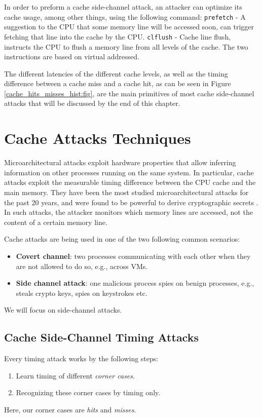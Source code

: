 In order to preform a cache side-channel attack, an attacker can optimize its cache usage, among other things, using the following command: \texttt{prefetch} - A suggestion to the CPU that some memory line will be accessed soon, can trigger fetching that line into the cache by the CPU. \texttt{clflush} - Cache line flush, instructs the CPU to flush a memory line from all levels of the cache. The two instructions are based on virtual addressed.

The different latencies of the different cache levels, as well as the timing difference between a cache miss and a cache hit, as can be seen in Figure \ref{cache_hits_misses_hist:fig}, are the main primitives of most cache side-channel attacks that will be discussed by the end of this chapter.  
\section{Cache Attacks Techniques}\label{cacheattackstech:sec}
Microarchitectural attacks exploit hardware properties that allow inferring information on other processes running on the same system.
In particular, cache attacks exploit the measurable timing difference between the CPU cache and the main memory. They have been the most studied microarchitectural attacks for the past 20 years, and were found to be powerful to derive cryptographic secrets \cite{Percival2009}. In such attacks, the attacker monitors which memory lines are accessed, not the content of a certain memory line.

\noindent Cache attacks are being used in one of the two following common scenarios:
\begin{itemize}
\item \textbf{Covert channel}: two processes communicating with each other when they are not allowed to do so, e.g., across VMs.
\item \textbf{Side channel attack}: one malicious process spies on benign processes, e.g., steals crypto keys, spies on keystrokes etc. 
\end{itemize}
We will focus on side-channel attacks.

\subsection{Cache Side-Channel Timing Attacks}
Every timing attack works by the following steps:
\begin{enumerate}
    \item Learn timing of different \textit{corner cases}.
    \item Recognizing these corner cases by timing only.
\end{enumerate}
Here, our corner cases are \textit{hits} and \textit{misses}.

